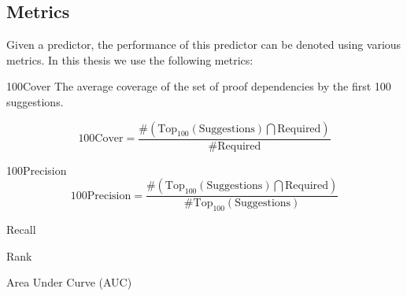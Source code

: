\subsection{Metrics}
Given a predictor, the performance of this predictor can be denoted using various metrics.
In this thesis we use the following metrics:


\begin{definition}{100Cover}
The average coverage of the set of proof dependencies by the first 100 suggestions.

\[ \text{100Cover} = \frac{ \#( \text{Top}_{100}(\text{Suggestions}) \bigcap \text{Required}) } { \#\text{Required} } \]
\end{definition}


\begin{definition}{100Precision}
\[ \text{100Precision} = \frac{ \#( \text{Top}_{100}(\text{Suggestions}) \bigcap \text{Required}) } { \#\text{Top}_{100}(\text{Suggestions}) } \]
\end{definition}

\begin{definition}{Recall}
\end{definition}

\begin{definition}{Rank}
\end{definition}

\begin{definition}{Area Under Curve (AUC)}
\end{definition}


